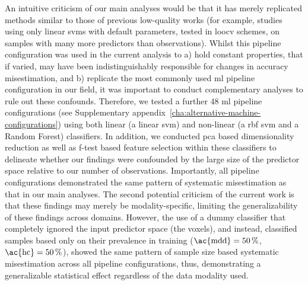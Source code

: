 \documentclass[12pt,a4paper]{article}
\begin{document}
    An intuitive criticism of our main analyses would be that it has merely replicated methods similar to those of previous low-quality works (for example, studies using only linear \acp{svm} with default parameters, tested in \ac{loocv} schemes, on samples with many more predictors than observations). Whilst this pipeline configuration was used in the current analysis to a) hold constant properties, that if varied, may have been indistinguishably responsible for changes in accuracy misestimation, and b) replicate the most commonly used \ac{ml} pipeline configuration in our field, it was important to conduct complementary analyses to rule out these confounds. Therefore, we tested a further \num{48} \ac{ml} pipeline configurations (see Supplementary appendix~\ref{cha:alternative-machine-configurations}) using both linear (a linear \ac{svm}) and non-linear (a \ac{rbf} \ac{svm} and a Random Forest) classifiers. In addition, we conducted \ac{pca} based dimensionality reduction as well as f-test based feature selection within these classifiers to delineate whether our findings were confounded by the large size of the predictor space relative to our number of observations. Importantly, all pipeline configurations demonstrated the same pattern of systematic misestimation as that in our main analyses. The second potential criticism of the current work is that these findings may merely be modality-specific, limiting the generalizability of these findings across domains. However, the use of a dummy classifier that completely ignored the input predictor space (the voxels), and instead, classified samples based only on their prevalence in training ($\text{\ac{mdd}}=\SI{50}{\percent}$, $\text{\ac{hc}}=\SI{50}{\percent}$), showed the same pattern of sample size based systematic misestimation across all pipeline configurations, thus, demonstrating a generalizable statistical effect regardless of the data modality used.
\end{document}
